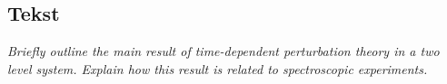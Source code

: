 \subsection{Tekst}

\emph{Briefly outline the main result of time-dependent perturbation theory in a two level system. Explain how this result is related to spectroscopic experiments.}